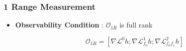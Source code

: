 \documentclass[]{article}
\begin{document}
\subsubsection{1 Range Measurement}
\begin{itemize}
	\item \textbf{Observability Condition} : $\mathcal{O}_{1R}$ is full rank
	
	\begin{equation*}
		\mathcal{O}_{1R} = [\nabla\mathcal{L}^0h;\nabla\mathcal{L}^1_{f_0}h;\nabla\mathcal{L}^2_{f_0f_1}h] 
	\end{equation*}
\end{itemize}
\end{document}
